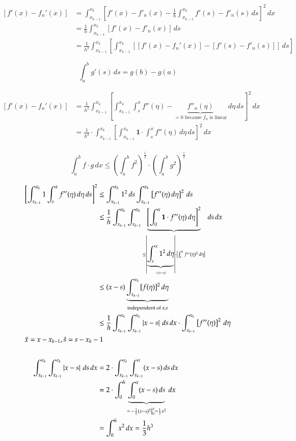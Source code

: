 \documentclass{article}
\newcommand{\card}[1]{\left|#1\right|}
\begin{document}
\begin{align*}
  \left[f'(x) - f_n'(x)\right]
    &= \int_{x_{k-1}}^{x_k} \left[f'(x) - f'_n(x) - \frac1h \int_{x_{k-1}}^{x_k} f'(s) - f'_n(s) \, ds\right]^2 \, dx \\
    &= \frac1h \int_{x_{k-1}}^{x_k} \left[f'(x) - f'_n(x)\right] \, ds \\
    &= \frac{1}{h^2} \int_{x_{k-1}}^{x_k} \left[\int_{x_{k-1}}^{x_k} \left[[f'(x) - f_n'(x)] - [f'(s) - f'_n(s)]\right] \, ds\right]
\end{align*}

\[ \int_a^b g'(s) \, ds = g(b) - g(a) \]

\begin{align*}
  \left[f'(x) - f_n'(x)\right]
    &= \frac1{h^2} \int_{x_{k-1}}^{x_k} \left[
      \int_{x_{k-1}}^{x_k} \int_s^x f''(\eta) - \underbrace{f''_n(\eta)}_{=0 \text{ because } f_n \text{ is linear}}
    \, d\eta \, ds \right]^2 \, dx \\
    &= \frac{1}{h^2} \cdot \int_{x_{k-1}}^{x_k} \left[\int_{x_{k-1}}^{x_k} \mathbf 1 \cdot \int_s^x f''(\eta) \, d\eta \, ds\right]^2 \, dx \\
\end{align*}

\[
  \int_a^b f \cdot g \, dx \le \left(\int_a^b f^2\right)^{\frac12} \cdot \left(\int_a^b g^2\right)^{\frac12}
\]

\begin{align*}
  \left[\int_{x_{k-1}}^{x_k} 1 \int_s^x f''(\eta) \, d\eta \, ds\right]^2
    &\leq \int_{x_{k-1}}^{x_k} 1^2 \, ds \int_{x_{k-1}}^{x_k} \left[f''(\eta) \, d\eta\right]^2 \, ds \\
    &\leq \frac1h \int_{x_{k-1}}^{x_k} \int_{x_{k-1}}^{x_k} \underbrace{\left[\int_0^x \mathbf 1 \cdot f''(\eta) \, d\eta \right]^2}_{\leq \card{\underbrace{\int_s^x 1^2 \, d\eta}_{= (x - s)}} \cdot \card{\int_s^x f''(\eta)^2 \, d\eta}} \, ds \, dx \\
    &\leq (x - s) \underbrace{\int_{x_{k-1}}^{x_k} [f(\eta)]^2 \, d\eta}_{\text{independent of } x, s} \\
    &\leq \frac1h \int_{x_{k-1}}^{x_k} \int_{x_{k-1}}^{x_k} \card{x - s} \, ds \, dx \cdot \int_{x_{k-1}}^{x_k} \left[f''(\eta)\right]^2 \, d\eta \\
  \intertext{$\hat{x} = x - x_{k-1}, \hat{s} = s - x_k - 1$} \\
  \int_{x_{k-1}}^{x_k} \int_{x_{k-1}}^{x_k} \card{x - s} \, ds \, dx
    &= 2 \cdot \int_{x_{k-1}}^{x_k} \int_{x_{k-1}}^{x} (x - s) \, ds \, dx \\
    &= 2 \cdot \int_0^h \underbrace{\int_0^x (x - s) \, ds}_{= \left. -\frac12 (x - s)^2 \right|_0^x = \frac12 x^2} \, dx \\
    &= \int_0^h x^2 \, dx = \frac13 h^3
\end{align*}
\end{document}
